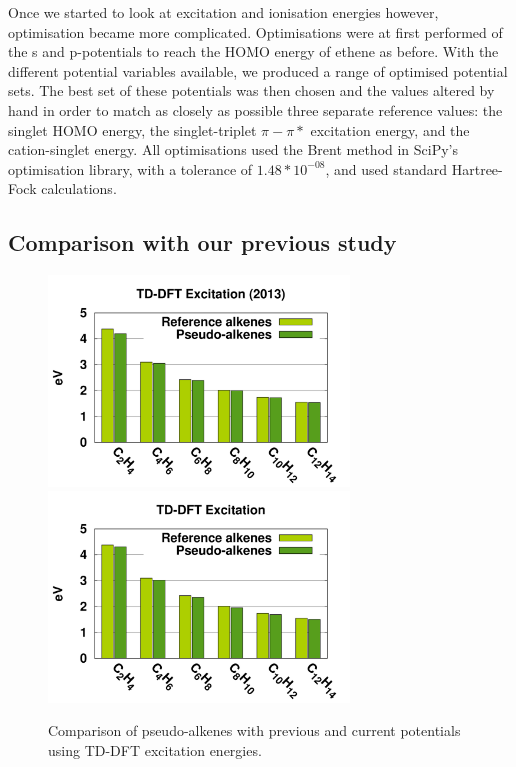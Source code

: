 \documentclass[aip,reprint]{revtex4-1}
\begin{document}
Once we started to look at excitation and ionisation energies however, optimisation became more complicated. Optimisations were at first performed of the s and p-potentials to reach the HOMO energy of ethene as before. With the different potential variables available, we produced a range of optimised potential sets. The best set of these potentials was then chosen and the values altered by hand in order to match as closely as possible three separate reference values: the singlet HOMO energy, the singlet-triplet \(\pi-\pi*\) excitation energy, and the cation-singlet energy. All optimisations used the Brent method in SciPy's optimisation library, with a tolerance of \(1.48*10^{-08}\), and used standard Hartree-Fock calculations.\cite{scipy}

\subsection{Comparison with our previous study}
\begin{figure}
\begin{center}
\includegraphics[width=8cm]{short_pbe0_tddft_2013}
\includegraphics[width=8cm]{short_pbe0_tddft}
\end{center}
\caption{Comparison of pseudo-alkenes with previous\cite{drujon_pseudopotentials_2013} and current potentials using TD-DFT excitation energies.}
\label{fig:alkenes_tddft}
\end{figure}
\end{document}
